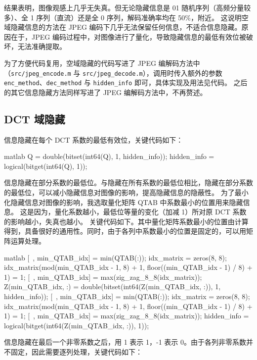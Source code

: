 \documentclass[a4paper]{article}  %
\begin{document}
结果表明，图像观感上几乎无失真。但无论隐藏信息是 01 随机序列（高频分量较多）、全 1 序列（直流）还是全 0 序列，解码准确率均在 50\%，附近。
这说明空域隐藏信息的方法在 JPEG 编码下几乎无法保留任何信息，不适合信息隐藏。原因在于，JPEG 编码过程中，对图像进行了量化，导致隐藏信息的最低有效位被破坏，无法准确提取。

为了方便代码复用，空域隐藏的代码写进了 JPEG 编解码方法中（\texttt{src/jpeg\_encode.m} 与 \texttt{src/jpeg\_decode.m}），调用时传入额外的参数 \texttt{enc\_method}、\texttt{dec\_method} 与 \texttt{hidden\_info} 即可，具体实现及用法见代码。
之后的其它信息隐藏方法同样写进了 JPEG 编解码方法中，不再赘述。

\subsection{DCT 域隐藏}

信息隐藏在每个 DCT 系数的最低有效位，关键代码如下：

\begin{codeblock}{matlab}
Q = double(bitset(int64(Q), 1, hidden_info));
hidden_info = logical(bitget(int64(Q), 1));
\end{codeblock}

信息隐藏在部分系数的最低位。与隐藏在所有系数的最低位相比，隐藏在部分系数的最低位，可以减小隐藏信息对图像的影响，提高隐藏信息的隐蔽性。
为了最小化隐藏信息对图像的影响，我选取量化矩阵 QTAB 中系数最小的位置用来隐藏信息。
这是因为，量化系数越小，最低位等量的变化（加减 1）所对原 DCT 系数的影响越小，失真也越小。
关键代码如下。其中量化矩阵系数最小的位置由计算得到，具备很好的通用性。同时，由于各列中系数最小的位置是固定的，可以用矩阵运算处理。

\begin{codeblock}{matlab}
[~, min_QTAB_idx] = min(QTAB(:));
idx_matrix = zeros(8, 8);
idx_matrix(mod(min_QTAB_idx - 1, 8) + 1, floor((min_QTAB_idx - 1) / 8) + 1) = 1;
[~, min_QTAB_idx] = max(zig_zag_8_8(idx_matrix));
Z(min_QTAB_idx, :) = double(bitset(int64(Z(min_QTAB_idx, :)), 1, hidden_info));
[~, min_QTAB_idx] = min(QTAB(:));
idx_matrix = zeros(8, 8);
idx_matrix(mod(min_QTAB_idx - 1, 8) + 1, floor((min_QTAB_idx - 1) / 8) + 1) = 1;
[~, min_QTAB_idx] = max(zig_zag_8_8(idx_matrix));
hidden_info = logical(bitget(int64(Z(min_QTAB_idx, :)), 1));
\end{codeblock}

信息隐藏在最后一个非零系数之后，用 1 表示 1，-1 表示 0。由于各列非零系数并不固定，因此需要逐列处理，关键代码如下：
\end{document}
